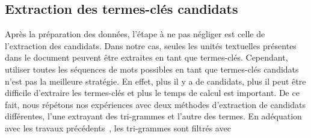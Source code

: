   \subsection{Extraction des termes-clés candidats}
  \label{subsec:extraction_des_termes_cles_candidats}
    Après la préparation des données, l'étape à ne pas négliger est celle
    de l'extraction des candidats. Dans notre cas, seules les unités textuelles
    présentes dans le document peuvent être extraites en tant que termes-clés.
    Cependant, utiliser toutes les séquences de mots possibles en tant que
    termes-clés candidats n'est pas la meilleure stratégie. En effet, plus il y
    a de candidats, plus il peut être difficile d'extraire les termes-clés et
    plus le temps de calcul est important. De ce fait, nous répétons nos
    expériences avec deux méthodes d'extraction de candidats différentes, l'une
    extrayant des tri-grammes et l'autre des termes. En adéquation avec les
    travaux précédents~\cite{witten1999kea}, les tri-grammes sont filtrés avec
